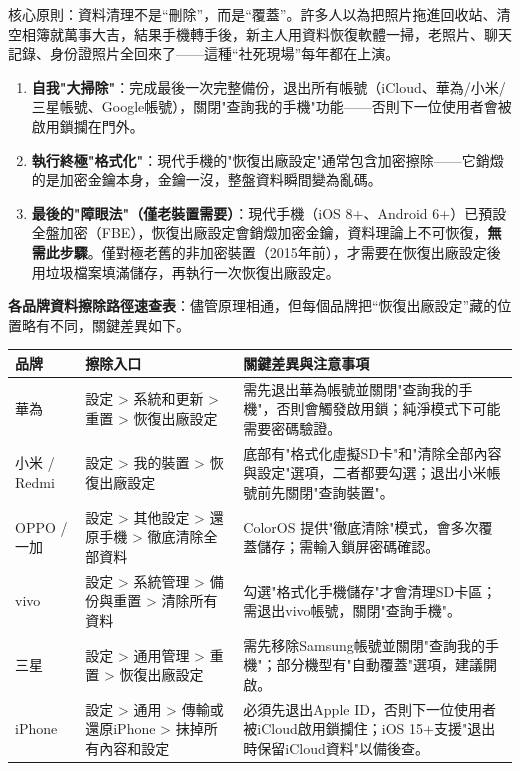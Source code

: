 


核心原則：資料清理不是“刪除”，而是“覆蓋”。許多人以為把照片拖進回收站、清空相簿就萬事大吉，結果手機轉手後，新主人用資料恢復軟體一掃，老照片、聊天記錄、身份證照片全回來了——這種“社死現場”每年都在上演。

\begin{enumerate}
  \item \textbf{自我"大掃除"}：完成最後一次完整備份，退出所有帳號（iCloud、華為/小米/三星帳號、Google帳號），關閉"查詢我的手機"功能——否則下一位使用者會被啟用鎖攔在門外。
  \item \textbf{執行終極"格式化"}：現代手機的"恢復出廠設定"通常包含加密擦除——它銷燬的是加密金鑰本身，金鑰一沒，整盤資料瞬間變為亂碼。
  \item \textbf{最後的"障眼法"（僅老裝置需要）}：現代手機（iOS 8+、Android 6+）已預設全盤加密（FBE），恢復出廠設定會銷燬加密金鑰，資料理論上不可恢復，\textbf{無需此步驟}。僅對極老舊的非加密裝置（2015年前），才需要在恢復出廠設定後用垃圾檔案填滿儲存，再執行一次恢復出廠設定。
\end{enumerate}

\textbf{各品牌資料擦除路徑速查表}：儘管原理相通，但每個品牌把“恢復出廠設定”藏的位置略有不同，關鍵差異如下。

\begin{center}
\begin{tabularx}{\linewidth}{|X|X|X|}
\hline
\textbf{品牌} & \textbf{擦除入口} & \textbf{關鍵差異與注意事項} \tabularnewline
\hline
華為 & 設定 > 系統和更新 > 重置 > 恢復出廠設定 & 需先退出華為帳號並關閉"查詢我的手機"，否則會觸發啟用鎖；純淨模式下可能需要密碼驗證。 \tabularnewline
小米 / Redmi & 設定 > 我的裝置 > 恢復出廠設定 & 底部有"格式化虛擬SD卡"和"清除全部內容與設定"選項，二者都要勾選；退出小米帳號前先關閉"查詢裝置"。 \tabularnewline
OPPO / 一加 & 設定 > 其他設定 > 還原手機 > 徹底清除全部資料 & ColorOS 提供"徹底清除"模式，會多次覆蓋儲存；需輸入鎖屏密碼確認。 \tabularnewline
vivo & 設定 > 系統管理 > 備份與重置 > 清除所有資料 & 勾選"格式化手機儲存"才會清理SD卡區；需退出vivo帳號，關閉"查詢手機"。 \tabularnewline
三星 & 設定 > 通用管理 > 重置 > 恢復出廠設定 & 需先移除Samsung帳號並關閉"查詢我的手機"；部分機型有"自動覆蓋"選項，建議開啟。 \tabularnewline
iPhone & 設定 > 通用 > 傳輸或還原iPhone > 抹掉所有內容和設定 & 必須先退出Apple ID，否則下一位使用者被iCloud啟用鎖攔住；iOS 15+支援"退出時保留iCloud資料"以備後查。 \tabularnewline
\hline
\end{tabularx}
\end{center}

